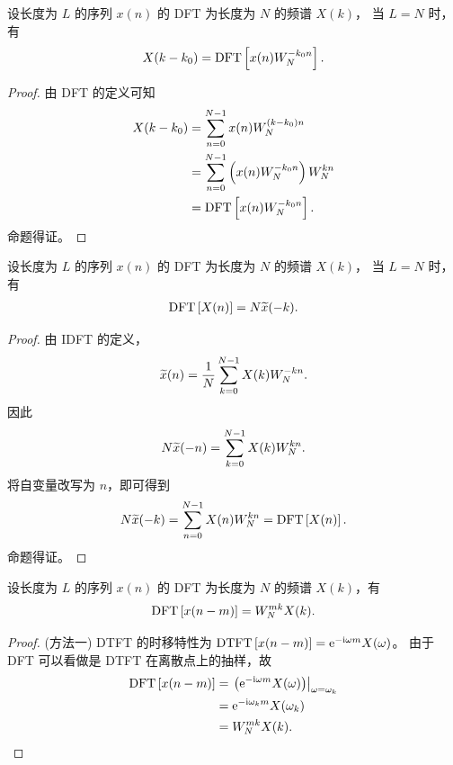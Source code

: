 \begin{property}
    设长度为 $L$ 的序列 $x(n)$ 的 DFT 为长度为 $N$ 的频谱 $X(k)$，
    当 $L = N$ 时，有
    \begin{align*}
        X(k - k_0) = \mathrm{DFT}\left[x(n)W_N^{-k_0n}\right].
    \end{align*}
\end{property}

\begin{proof}
    由 DFT 的定义可知
    \begin{align*}
        X(k - k_0) & = \sum_{n = 0}^{N - 1}x(n)W_N^{(k - k_0)n} \\
        & = \sum_{n = 0}^{N - 1}\left(x(n)W_N^{-k_0n}\right)W_N^{kn} \\
        & = \mathrm{DFT}\left[x(n)W_N^{-k_0n}\right].
    \end{align*}
    命题得证。
\end{proof}

\begin{property}
    设长度为 $L$ 的序列 $x(n)$ 的 DFT 为长度为 $N$ 的频谱 $X(k)$，
    当 $L = N$ 时，有
    \begin{align*}
        \mathrm{DFT}\left[X(n)\right] = N\widetilde{x}(-k).
    \end{align*}
\end{property}

\begin{proof}
    由 IDFT 的定义，
    \begin{align*}
        \widetilde{x}(n) = \frac{1}{N}\sum_{k = 0}^{N - 1}X(k)W_N^{-kn}.
    \end{align*}
    因此
    \begin{align*}
        N\widetilde{x}(-n) = \sum_{k = 0}^{N - 1}X(k)W_N^{kn}.
    \end{align*}
    将自变量改写为 $n$，即可得到
    \begin{align*}
        N\widetilde{x}(-k) = \sum_{n = 0}^{N - 1}X(n)W_N^{kn} = \mathrm{DFT}\left[X(n)\right].
    \end{align*}
    命题得证。
\end{proof}

\begin{property}
    设长度为 $L$ 的序列 $x(n)$ 的 DFT 为长度为 $N$ 的频谱 $X(k)$，有
    \begin{align*}
        \mathrm{DFT}\left[x(n - m)\right] = W_N^{mk}X(k).
    \end{align*}
\end{property}

\begin{proof}
    (方法一)
    DTFT 的时移特性为 $\mathrm{DTFT}\left[x(n - m)\right] = \mathrm{e}^{-\mathrm{i}\omega m}X(\omega)$。
    由于 DFT 可以看做是 DTFT 在离散点上的抽样，故
    \begin{align*}
        \mathrm{DFT}\left[x(n - m)\right] & = \left.\left(\mathrm{e}^{-\mathrm{i}\omega m}X(\omega)\right)\right|_{\omega = \omega_k} \\
        & = \mathrm{e}^{-\mathrm{i}\omega_k m}X(\omega_k) \\
        & = W_N^{mk}X(k).
    \end{align*}
\end{proof}

